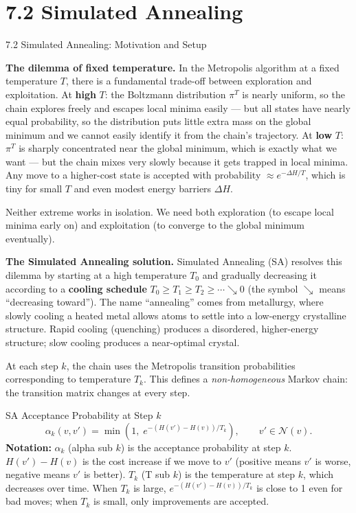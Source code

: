 \documentclass[aspectratio=169,10pt]{beamer}
\newcommand{\calN}{\mathcal{N}}
\begin{document}
\section{7.2 Simulated Annealing}

\begin{frame}[allowframebreaks]{7.2 Simulated Annealing: Motivation and Setup}

\textbf{The dilemma of fixed temperature.}
In the Metropolis algorithm at a fixed temperature $T$, there is a
fundamental trade-off between exploration and exploitation.  At
\textbf{high} $T$: the Boltzmann distribution $\pi^T$ is nearly uniform, so
the chain explores freely and escapes local minima easily --- but all states
have nearly equal probability, so the distribution puts little extra mass on
the global minimum and we cannot easily identify it from the chain's
trajectory.  At \textbf{low} $T$: $\pi^T$ is sharply concentrated near the
global minimum, which is exactly what we want --- but the chain mixes very
slowly because it gets trapped in local minima.  Any move to a higher-cost
state is accepted with probability $\approx e^{-\Delta H / T}$, which is
tiny for small $T$ and even modest energy barriers $\Delta H$.

Neither extreme works in isolation.  We need both exploration (to escape
local minima early on) and exploitation (to converge to the global minimum
eventually).

\medskip
\textbf{The Simulated Annealing solution.}
Simulated Annealing (SA) resolves this dilemma by starting at a high
temperature $T_0$ and gradually decreasing it according to a
\textbf{cooling schedule} $T_0 \ge T_1 \ge T_2 \ge \cdots \searrow 0$
(the symbol $\searrow$ means ``decreasing toward'').  The name ``annealing''
comes from metallurgy, where slowly cooling a heated metal allows atoms to
settle into a low-energy crystalline structure.  Rapid cooling (quenching)
produces a disordered, higher-energy structure; slow cooling produces a
near-optimal crystal.

At each step $k$, the chain uses the Metropolis transition probabilities
corresponding to temperature $T_k$.  This defines a
\emph{non-homogeneous} Markov chain: the transition matrix changes at every
step.

\begin{block}{SA Acceptance Probability at Step $k$}
  \[
    \alpha_k(v,v') = \min\!\left(1,\; e^{-(H(v')-H(v))/T_k}\right),
    \qquad v' \in \calN(v).
  \]
  \textbf{Notation:} $\alpha_k$ (alpha sub $k$) is the acceptance
  probability at step $k$.  $H(v') - H(v)$ is the cost increase if we move
  to $v'$ (positive means $v'$ is worse, negative means $v'$ is better).
  $T_k$ (T sub $k$) is the temperature at step $k$, which decreases
  over time.  When $T_k$ is large, $e^{-(H(v')-H(v))/T_k}$ is close to 1
  even for bad moves; when $T_k$ is small, only improvements are accepted.
\end{block}


\end{frame}
\end{document}
